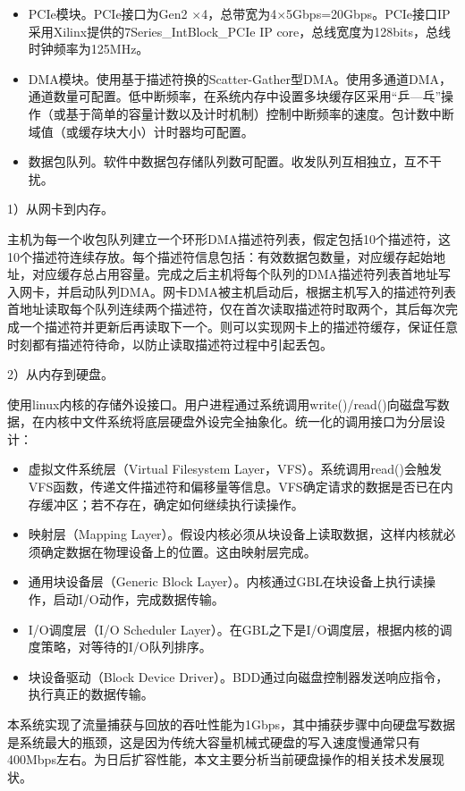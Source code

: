 \begin{itemize}
	\item PCIe模块。PCIe接口为Gen2 $\times$4，总带宽为4$\times$5Gbps=20Gbps。PCIe接口IP采用Xilinx提供的7Series\_IntBlock\_PCIe IP core，总线宽度为128bits，总线时钟频率为125MHz。
	\item DMA模块。使用基于描述符换的Scatter-Gather型DMA。使用多通道DMA，通道数量可配置。低中断频率，在系统内存中设置多块缓存区采用“乒---乓”操作（或基于简单的容量计数以及计时机制）控制中断频率的速度。包计数中断域值（或缓存块大小）计时器均可配置。
	\item 数据包队列。软件中数据包存储队列数可配置。收发队列互相独立，互不干扰。
\end{itemize}

1）从网卡到内存。

主机为每一个收包队列建立一个环形DMA描述符列表，假定包括10个描述符，这10个描述符连续存放。每个描述符信息包括：有效数据包数量，对应缓存起始地址，对应缓存总占用容量。完成之后主机将每个队列的DMA描述符列表首地址写入网卡，并启动队列DMA。网卡DMA被主机启动后，根据主机写入的描述符列表首地址读取每个队列连续两个描述符，仅在首次读取描述符时取两个，其后每次完成一个描述符并更新后再读取下一个。则可以实现网卡上的描述符缓存，保证任意时刻都有描述符待命，以防止读取描述符过程中引起丢包。

2）从内存到硬盘。

使用linux内核的存储外设接口。用户进程通过系统调用write()/read()向磁盘写数据，在内核中文件系统将底层硬盘外设完全抽象化。统一化的调用接口为分层设计：

\begin{itemize}
	\item 虚拟文件系统层（Virtual Filesystem Layer，VFS）。系统调用read()会触发VFS函数，传递文件描述符和偏移量等信息。VFS确定请求的数据是否已在内存缓冲区；若不存在，确定如何继续执行读操作。
	\item 映射层（Mapping Layer）。假设内核必须从块设备上读取数据，这样内核就必须确定数据在物理设备上的位置。这由映射层完成。
	\item 通用块设备层（Generic Block Layer）。内核通过GBL在块设备上执行读操作，启动I/O动作，完成数据传输。
	\item I/O调度层（I/O Scheduler Layer）。在GBL之下是I/O调度层，根据内核的调度策略，对等待的I/O队列排序。
	\item 块设备驱动（Block Device Driver）。BDD通过向磁盘控制器发送响应指令，执行真正的数据传输。
\end{itemize}

本系统实现了流量捕获与回放的吞吐性能为1Gbps，其中捕获步骤中向硬盘写数据是系统最大的瓶颈，这是因为传统大容量机械式硬盘的写入速度慢通常只有400Mbps左右。为日后扩容性能，本文主要分析当前硬盘操作的相关技术发展现状。

